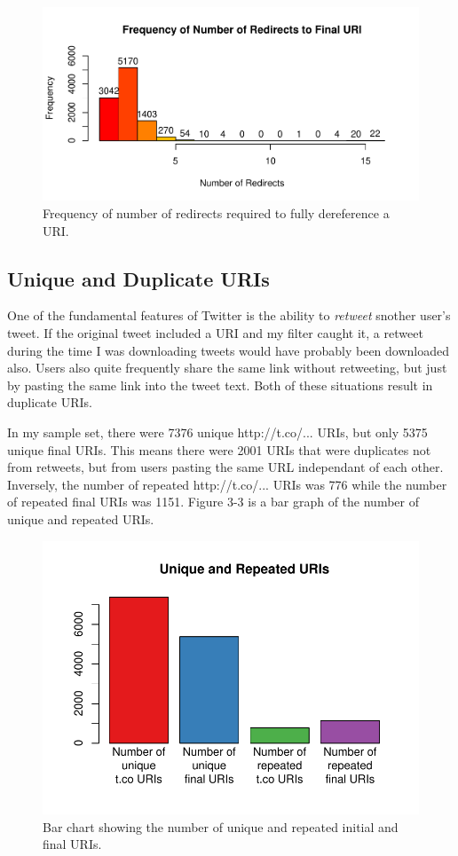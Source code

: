 \documentclass[a4paper,12pt]{article}
\begin{document}
\begin{figure}[H]
    \centering
    \includegraphics{stats/num_redirects.pdf}
    \caption{Frequency of number of redirects required to fully dereference a URI.}
\end{figure}

\subsection{Unique and Duplicate URIs}
One of the fundamental features of Twitter is the ability to \emph{retweet} snother user's tweet.
If the original tweet included a URI and my filter caught it, a retweet during the time I was
downloading tweets would have probably been downloaded also. Users also quite frequently share the
same link without retweeting, but just by pasting the same link into the tweet text. Both of these
situations result in duplicate URIs.

In my sample set, there were 7376 unique http://t.co/... URIs,
but only 5375 unique final URIs. This means there were 2001 URIs that were duplicates not from
retweets, but from users pasting the same URL independant of each other.  
Inversely, the number of repeated http://t.co/... URIs was 776 while the number of repeated final
URIs was 1151. Figure 3-3 is a bar graph of the number of unique and repeated URIs. 
\begin{figure}[H]
    \centering
    \includegraphics{stats/unique_and_dupe.pdf}
    \caption{Bar chart showing the number of unique and repeated initial and final URIs.}
\end{figure}
\end{document}
